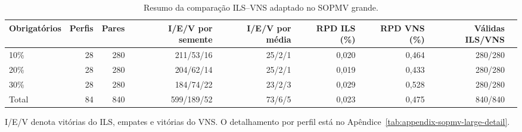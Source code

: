 \begin{table}[htbp]
\centering
\caption{Resumo da compara\c{c}\~ao ILS--VNS adaptado no SOPMV grande.}
\label{tab:ils-vns-sopmv-large-summary}
\begin{adjustbox}{max width=\textwidth}
\begin{tabular}{lrrrrrrrr}
\toprule
Obrigat\'orios & Perfis & Pares & I/E/V por semente & I/E/V por m\'edia & RPD ILS (\%) & RPD VNS (\%) & V\'alidas ILS/VNS \\
\midrule
10\% & 28 & 280 & 211/53/16 & 25/2/1 & 0{,}020 & 0{,}464 & 280/280 \\
20\% & 28 & 280 & 204/62/14 & 25/2/1 & 0{,}019 & 0{,}433 & 280/280 \\
30\% & 28 & 280 & 184/74/22 & 23/2/3 & 0{,}029 & 0{,}528 & 280/280 \\
\midrule
Total & 84 & 840 & 599/189/52 & 73/6/5 & 0{,}023 & 0{,}475 & 840/840 \\
\bottomrule
\end{tabular}
\end{adjustbox}
\begin{minipage}{0.96\linewidth}\footnotesize I/E/V denota vit\'orias do ILS, empates e vit\'orias do VNS. O detalhamento por perfil est\'a no Ap\^endice~\ref{tab:appendix-sopmv-large-detail}.\end{minipage}
\end{table}

